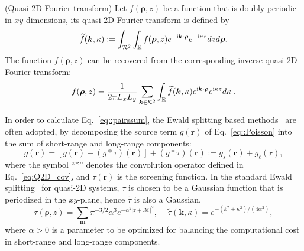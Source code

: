 \begin{defn}\label{Def::Fourier}(Quasi-2D Fourier transform) 
	Let $f(\bm{\rho},z)$ be a function that is doubly-periodic in $xy$-dimensions, its quasi-2D Fourier transform is defined by
	\begin{equation}
		\widetilde{f}(\bm{k},\kappa):=\int_{\mathcal{R}^2}\int_{\mathbb{R}}f(\bm{\rho},z)e^{-\mathrm{i} \bm{k}\cdot\bm{\rho}}e^{- \mathrm{i} \kappa z}dzd\bm{\rho}.
	\end{equation}
	The function $f(\bm{\rho},z)$ can be recovered from the corresponding inverse quasi-2D Fourier transform:
	\begin{equation}
		f(\bm{\rho},z)=\frac{1}{2 \pi L_x L_y}\sum_{\bm{k} \in \mathcal{K}^2} \int_{\mathbb{R}} \widetilde{f}(\bm{k}, \kappa) e^{\mathrm{i} \bm{k} \cdot \bm{\rho}} e^{\mathrm{i} \kappa z} d\kappa\;.
	\end{equation}
\end{defn}

In order to calculate Eq.~\eqref{eq::pairssum}, the Ewald splitting based methods~\cite{Ewald1921AnnPhys} are often adopted, by decomposing the source term $g(\bm{r})$ of Eq.~\eqref{eq::Poisson} into the sum of short-range and long-range components:
\begin{equation}
	g(\bm{r})=\left[g(\bm{r})-(g\ast\tau)(\bm{r})\right]+(g\ast\tau)(\bm{r}):=g_{s}(\bm{r})+g_{\ell}(\bm{r}),
\end{equation}
where the symbol ``$\ast$'' denotes the convolution operator defined in Eq.~\eqref{eq:Q2D_cov}, and $\tau(\bm{r})$ is the screening function.
In the standard Ewald splitting~\cite{Ewald1921AnnPhys,tornberg2016ewald} for quasi-2D systems, $\tau$ is chosen to be a Gaussian function that is periodized in the $xy$-plane, hence $\widetilde{\tau}$ is also a Gaussian, 
\begin{equation}  
\tau(\bm{\rho},z)=\sum_{\bm{m}}\pi^{-3/2}\alpha^3 e^{-\alpha^2 |\bm{r}+\bm{\mathcal{M}}|^2},\quad~ \widetilde{\tau}(\bm{k},\kappa)=e^{-(k^2+\kappa^2)/(4\alpha^2)},
\end{equation}
where $\alpha>0$ is a parameter to be optimized for balancing the computational cost in short-range and long-range components.

